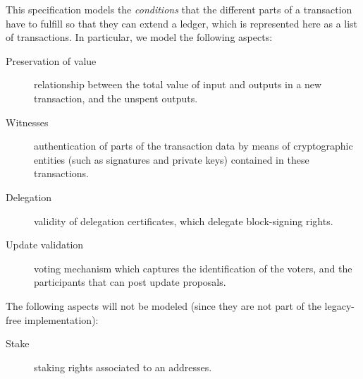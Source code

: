 This specification models the \textit{conditions} that the different parts of a
transaction have to fulfill so that they can extend a ledger, which is
represented here as a list of transactions. In particular, we model the
following aspects:

\begin{description}
\item[Preservation of value] relationship between the total value of input and
  outputs in a new transaction, and the unspent outputs.
\item[Witnesses] authentication of parts of the transaction data by means of
  cryptographic entities (such as signatures and private keys) contained in
  these transactions.
\item[Delegation] validity of delegation certificates, which delegate
  block-signing rights.
\item[Update validation] voting mechanism which captures the identification of
  the voters, and the participants that can post update proposals.
\end{description}

The following aspects will not be modeled (since they are not part of the legacy-free
implementation):
\begin{description}
\item[Stake] staking rights associated to an addresses.
\end{description}
